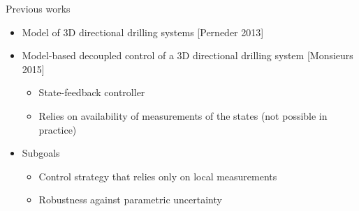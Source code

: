 \documentclass[10pt]{beamer}
\begin{document}
\begin{frame}{Previous works}
	\begin{itemize}\setlength\itemsep{1em}
		\item Model of 3D directional drilling systems [Perneder 2013]
		\item Model-based decoupled control of a 3D directional drilling system [Monsieurs 2015]
		\begin{itemize}\setlength\itemsep{1em}
			\item State-feedback controller
			\item Relies on availability of measurements of the states (not possible in practice)
		\end{itemize}
	\item []\begin{block}{Subgoals}	
	\begin{itemize}\setlength\itemsep{1em}
		\item Control strategy that relies only on local measurements
		\item Robustness against parametric uncertainty
	\end{itemize}
	\end{block}
	\end{itemize}
\end{frame}
\end{document}
